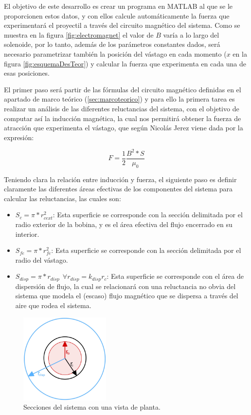 El objetivo de este desarrollo es crear un programa en MATLAB al que se le proporcionen estos datos, y con ellos calcule automáticamente la fuerza que experimentará el proyectil a través del circuito magnético del sistema. Como se muestra en la figura \ref{fig:electromagnet} el valor de \(B\) varía a lo largo del solenoide, por lo tanto, además de los parámetros constantes dados, será necesario parametrizar también la posición del vástago en cada momento (\(x\) en la figura \ref{fig:esquemaDesTeor}) y calcular la fuerza que experimenta en cada una de esas posiciones.

El primer paso será partir de las fórmulas del circuito magnético definidas en el apartado de marco teórico (\ref{sec:marcoteorico}) y para ello la primera tarea es realizar un análisis de las diferentes reluctancias del sistema, con el objetivo de computar así la inducción magnética, la cual nos permitirá obtener la fuerza de atracción que experimenta el vástago, que según Nicolás Jerez \citep{jerez2016resueltos} viene dada por la expresión:

\begin{center}
\[F=\frac{1}{2}\frac{B^2*S}{\mu_0}\]
\end{center}

Teniendo clara la relación entre inducción y fuerza, el siguiente paso es definir claramente las diferentes áreas efectivas de los componentes del sistema para calcular las reluctancias, las cuales son:

\begin{itemize}
    \item \(S_{c}=\pi *r_{cext}^2\): Esta superficie se corresponde con la sección delimitada por el radio exterior de la bobina, y es el área efectiva del flujo encerrado en su interior.
    \item \(S_{fe}=\pi *r_{fe}^2\): Esta superficie se corresponde con la sección delimitada por el radio del vástago.
    \item \(S_{disp}=\pi *r_{disp}~~\forall r_{disp} = k_{disp}r_c\): Esta superficie se corresponde con el área de dispersión de flujo, la cual se relacionará con una reluctancia no obvia del sistema que modela el (escaso) flujo magnético que se dispersa a través del aire que rodea el sistema.
\end{itemize}

\begin{figure}[H]
    \centering
    \includegraphics[width=4.5cm]{FigurasMemoria/areasFlujo.jpg}
    \caption{Secciones del sistema con una vista de planta.}
    \label{fig:areasFlujo} %
\end{figure}

